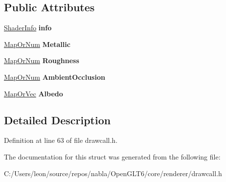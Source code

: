 \subsection*{Public Attributes}
\begin{DoxyCompactItemize}
\item 
\mbox{\label{structnabla_1_1renderer_1_1_p_b_r_draw_call_a09375a8875877a74aeb824ab7a62197b}} 
\mbox{\hyperlink{structnabla_1_1renderer_1_1_shader_info}{Shader\+Info}} {\bfseries info}
\item 
\mbox{\label{structnabla_1_1renderer_1_1_p_b_r_draw_call_a5c6b484e5fc802119f7ee510be9fe428}} 
\mbox{\hyperlink{unionnabla_1_1renderer_1_1_p_b_r_draw_call_1_1_map_or_num}{Map\+Or\+Num}} {\bfseries Metallic}
\item 
\mbox{\label{structnabla_1_1renderer_1_1_p_b_r_draw_call_a84b5feffa75aaa955cae2f43e224de1c}} 
\mbox{\hyperlink{unionnabla_1_1renderer_1_1_p_b_r_draw_call_1_1_map_or_num}{Map\+Or\+Num}} {\bfseries Roughness}
\item 
\mbox{\label{structnabla_1_1renderer_1_1_p_b_r_draw_call_a40ab6452ff7c1cec225cb65b43459303}} 
\mbox{\hyperlink{unionnabla_1_1renderer_1_1_p_b_r_draw_call_1_1_map_or_num}{Map\+Or\+Num}} {\bfseries Ambient\+Occlusion}
\item 
\mbox{\label{structnabla_1_1renderer_1_1_p_b_r_draw_call_a0ce92bba1f14a72a896245b1a89358a0}} 
\mbox{\hyperlink{unionnabla_1_1renderer_1_1_p_b_r_draw_call_1_1_map_or_vec}{Map\+Or\+Vec}} {\bfseries Albedo}
\end{DoxyCompactItemize}


\subsection{Detailed Description}


Definition at line 63 of file drawcall.\+h.



The documentation for this struct was generated from the following file\+:\begin{DoxyCompactItemize}
\item 
C\+:/\+Users/leon/source/repos/nabla/\+Open\+G\+L\+T6/core/renderer/drawcall.\+h\end{DoxyCompactItemize}
